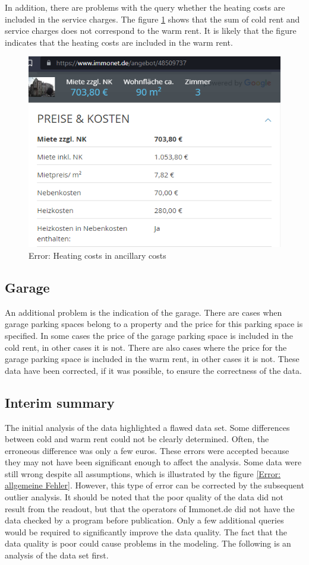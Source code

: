 In addition, there are problems with the query whether the heating costs are included in the service charges. The figure \ref{fig: Heikosten in NK} shows that the sum of cold rent and service charges does not correspond to the warm rent. It is likely that the figure indicates that the heating costs are included in the warm rent.

\begin{figure}[H]
	\centering
	\includegraphics[width=0.7\linewidth]{img/48509737}
	\caption{Error:  Heating costs in ancillary costs}
	\label{fig: Heikosten in NK}
\end{figure}


\subsection{Garage}

An additional problem is the indication of the garage. There are cases when garage parking spaces belong to a property and the price for this parking space is specified. In some cases the price of the garage parking space is included in the cold rent, in other cases it is not. There are also cases where the price for the garage parking space is included in the warm rent, in other cases it is not. These data have been corrected, if it was possible, to ensure the correctness of the data. 



\subsection{Interim summary}

The initial analysis of the data highlighted a flawed data set. Some differences between cold and warm rent could not be clearly determined. Often, the erroneous difference was only a few euros. These errors were accepted because they may not have been significant enough to affect the analysis. Some data were still wrong despite all assumptions, which is illustrated by the figure \ref{Error: allgemeine Fehler}.  However, this type of error can be corrected by the subsequent outlier analysis. It should be noted that the poor quality of the data did not result from the readout, but that the operators of Immonet.de did not have the data checked by a program before publication. Only a few additional queries would be required to significantly improve the data quality. The fact that the data quality is poor could cause problems in the modeling. The following is an analysis of the data set first.

